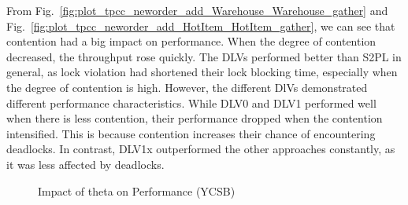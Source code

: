 \documentclass[conference]{IEEEtran}
\begin{document}
From Fig.~\ref{fig:plot_tpcc_neworder_add_Warehouse_Warehouse_gather} and
Fig.~\ref{fig:plot_tpcc_neworder_add_HotItem_HotItem_gather},
we can see that contention had a big impact on performance. When the degree of contention decreased, the throughput rose quickly.
The DLVs performed better than S2PL in general, as lock violation had shortened their lock blocking time, especially when the degree of contention is high.
However, the different DlVs demonstrated different performance characteristics. 
While DLV0 and DLV1 performed well when there is less contention, their performance dropped when the contention intensified.
This is because contention increases their chance of encountering deadlocks.
In contrast, DLV1x outperformed the other approaches constantly, as it was less affected by deadlocks.


\begin{figure}[tbp]
  \centering
      \caption{Impact of theta on Performance (YCSB) }
      \label{fig:plot_ycsb_add_Theta_Theta_TPM_gather}
\end{figure}
\end{document}
